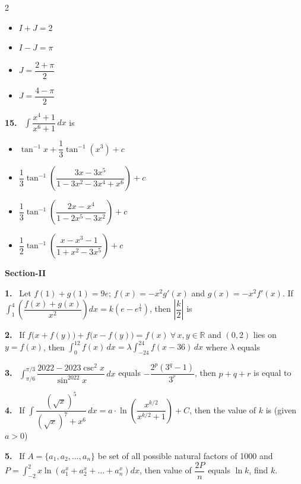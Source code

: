\documentclass[10pt]{extarticle}
\newcommand{\sect}[1]{\par\smallskip\noindent\textbf{#1}\par}
\newcommand{\qn}[1]{\par\smallskip\noindent\textbf{#1.}~}
\newenvironment{qoptions}{\begin{itemize}[leftmargin=1.8em,itemsep=1pt,topsep=2pt,label={}]}{\end{itemize}}
\newcommand{\opt}[2]{\item[(#1)] #2}
\begin{document}
\begin{multicols}{2}
\begin{qoptions}
\opt{A}{$I+J=2$}
\opt{B}{$I-J=\pi$}
\opt{C}{$J=\dfrac{2+\pi}{2}$}
\opt{D}{$J=\dfrac{4-\pi}{2}$}
\end{qoptions}
\qn{15} $\displaystyle\int\dfrac{x^4+1}{x^6+1}\,dx$ is
\begin{qoptions}
\opt{A}{$\tan^{-1}x+\dfrac13\tan^{-1}\left(x^3\right)+c$}
\opt{B}{$\dfrac13\tan^{-1}\left(\dfrac{3x-3x^5}{1-3x^2-3x^4+x^6}\right)+c$}
\opt{C}{$\dfrac13\tan^{-1}\left(\dfrac{2x-x^4}{1-2x^5-3x^2}\right)+c$}
\opt{D}{$\dfrac12\tan^{-1}\left(\dfrac{x-x^3-1}{1+x^2-3x^5}\right)+c$}
\end{qoptions}
\sect{Section-II}
\qn{1} Let $f(1)+g(1)=9e$; $f(x)=-x^2g'(x)$ and $g(x)=-x^2f'(x)$. If $\displaystyle\int_1^4\left(\dfrac{f(x)+g(x)}{x^2}\right)dx=k\left(e-e^{\frac14}\right)$, then $\left|\dfrac k2\right|$ is
\qn{2} If $f\bigl(x+f(y)\bigr)+f\bigl(x-f(y)\bigr)=f(x)\ \forall\, x,y\in\mathbb R$ and $(0,2)$ lies on $y=f(x)$, then $\displaystyle\int_0^{12}f(x)\,dx=\lambda\int_{-24}^{24}f(x-36)\,dx$ where $\lambda$ equals
\qn{3} $\displaystyle\int_{\pi/6}^{\pi/3}\dfrac{2022-2023\csc^2x}{\sin^{2022}x}\,dx$ equals $-\dfrac{2^p\left(3^q-1\right)}{3^r}$, then $p+q+r$ is equal to
\qn{4} If $\displaystyle\int\dfrac{\left(\sqrt x\right)^5}{\left(\sqrt x\right)^7+x^6}\,dx=a\cdot\ln\left(\dfrac{x^{k/2}}{x^{k/2}+1}\right)+C$, then the value of $k$ is (given $a>0$)
\qn{5} If $A=\{a_1,a_2,\dots,a_n\}$ be set of all possible natural factors of 1000 and $P=\displaystyle\int_{-2}^{2}x\ln\left(a_1^x+a_2^x+\dots+a_n^x\right)dx$, then value of $\dfrac{2P}{n}$ equals $\ln k$, find $k$.
\end{multicols}
\end{document}
